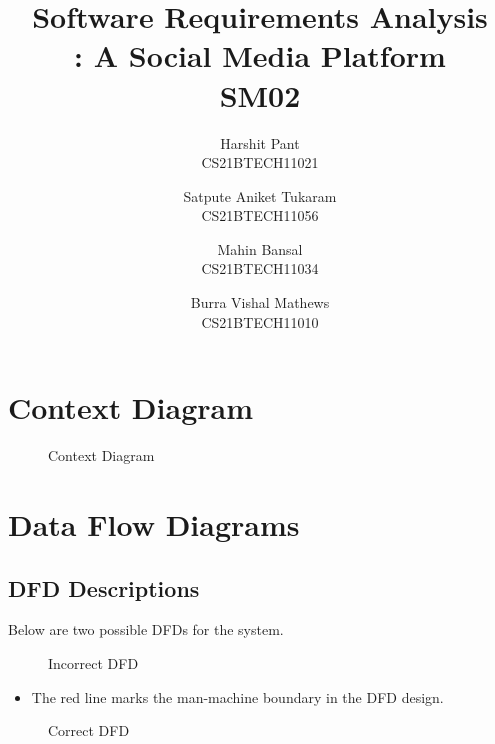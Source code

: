 \documentclass[11pt]{article}
\title{Software Requirements Analysis\\\Name : A Social Media Platform\\ SM02}
\author{Harshit Pant \\ CS21BTECH11021 \and Satpute Aniket Tukaram \\ CS21BTECH11056 \and Mahin Bansal \\ CS21BTECH11034 \and Burra Vishal Mathews \\ CS21BTECH11010}
\date{}
\begin{document}
\maketitle
\begin{center}
    \tableofcontents
\end{center}
\section{Context Diagram}
\begin{figure}[H]
    \centering
    \caption{Context Diagram}
    \label{fig:context_diagram}
\end{figure}
\newpage
\section{Data Flow Diagrams}
\subsection{DFD Descriptions}
Below are two possible DFDs for the system.

\begin{figure}[H]
    \centering
    \caption{Incorrect DFD}
\end{figure}
\begin{itemize}
    \item The red line marks the man-machine boundary in the DFD design.
\end{itemize}
\newpage
\begin{figure}[H]
    \centering
    \caption{Correct DFD}
\end{figure}
\end{document}
